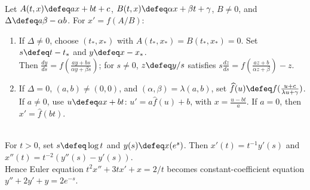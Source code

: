 \begin{method} \label{meth:affine-fractional-first-order-reduction} \\
Let $A(t,x)\defeq ax+bt+c$, $B(t,x)\defeq\alpha x+\beta t+\gamma$, $B\neq0$, and $\Delta\defeq a\beta-\alpha b$. For $x'=f(A/B)$:
\begin{enumerate}[label=(\roman*)]
\setlength{\itemsep}{0pt}
\item If $\Delta\neq0$, choose $(t_*,x_*)$ with $A(t_*,x_*)=B(t_*,x_*)=0$. Set $s\defeq t-t_*$ and $y\defeq x-x_*$.\\
Then $\frac{dy}{ds}=f(\frac{ay+bs}{\alpha y+\beta s})$; for $s\neq0$, $z\defeq y/s$ satisfies $s\frac{dz}{ds}=f(\frac{az+b}{\alpha z+\beta})-z$.
\item If $\Delta=0$, $(a,b)\neq(0,0)$, and $(\alpha,\beta)=\lambda(a,b)$, set $\widehat{f}(u)\defeq f(\frac{u+c}{\lambda u+\gamma})$.\\
If $a\neq0$, use $u\defeq ax+bt$: $u'=a\widehat{f}(u)+b$, with $x=\frac{u-bt}{a}$. If $a=0$, then $x'=\widehat{f}(bt)$.
\end{enumerate}
\end{method}

\begin{example} \label{ex:euler-equation-log-time} \\
For $t>0$, set $s\defeq\log t$ and $y(s)\defeq x(e^s)$. Then $x'(t)=t^{-1}y'(s)$ and $x''(t)=t^{-2}(y''(s)-y'(s))$.\\
Hence Euler equation $t^2x''+3tx'+x=2/t$ becomes constant-coefficient equation $y''+2y'+y=2e^{-s}$.
\end{example}

